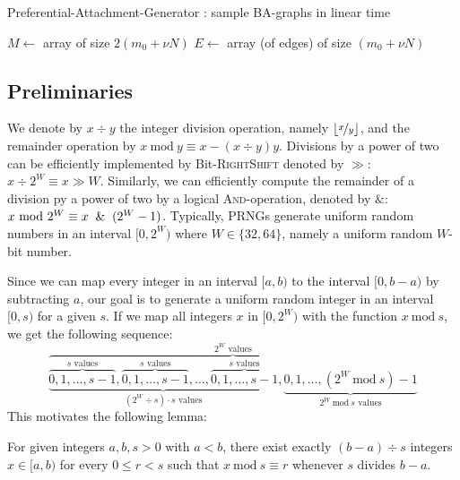 \documentclass[a4paper, UKenglish, cleveref, autoref, thm-restate]{lipics-v2021}
\newcommand{\Mod}[1]{\ \mathrm{mod}\ #1}
\begin{document}
\begin{algorithm}[!htb] \label{alg:ba}
    \caption{Preferential-Attachment-Generator \cite{BASampling}: sample BA-graphs in linear time}
    $M \leftarrow$ array of size $2\left(m_0 + \nu N\right)$\;
    $E \leftarrow$ array (of edges) of size $\left(m_0 + \nu N\right)$\;
    \;
\end{algorithm}


\subsection{Preliminaries}
We denote by $x \div y$ the integer division operation, namely $\lfloor\nicefrac{x}{y}\rfloor$, and the remainder operation by $x \Mod y \equiv x - (x \div y)y$. 
Divisions by a power of two can be efficiently implemented by Bit-\textsc{RightShift} denoted by $\gg$: $x \div 2^W \equiv x \gg W$.
Similarly, we can efficiently compute the remainder of a division py a power of two by a logical \textsc{And}-operation, denoted by $\&$: $x \Mod 2^W \equiv x \And (2^W - 1)$.
Typically, PRNGs generate uniform random numbers in an interval $[0,2^W)$ where $W \in \{32,64\}$, namely a uniform random $W$-bit number.

Since we can map every integer in an interval $[a,b)$ to the interval $[0,b - a)$ by subtracting $a$, our goal is to generate a uniform random integer in an interval $[0,s)$ for a given $s$.
If we map all integers $x$ in $[0,2^W)$ with the function $x \Mod s$, we get the following sequence:
{\Large
\[
    \overbrace{\underbrace{\overbrace{0,1,\ldots,s - 1}^{\text{$s$ values}},\overbrace{0,1,\ldots,s - 1}^{\text{$s$ values}},\ldots,\overbrace{0,1,\ldots,s - 1}^{\text{$s$ values}}}_{\text{$\left(2^W \div s\right) \cdot s$ values}},\underbrace{0,1,\ldots,\left(2^W \Mod s\right) - 1}_{\text{$2^W \Mod s$ values}}}^{\text{$2^W$ values}}
\]
}%
This motivates the following lemma:
\begin{lemma}
    For given integers $a,b,s > 0$ with $a < b$, there exist exactly $(b - a) \div s$ integers $x \in [a,b)$ for every $0 \leq r < s$ such that $x \Mod s \equiv r$ whenever $s$ divides $b - a$.
\end{lemma}
\end{document}
